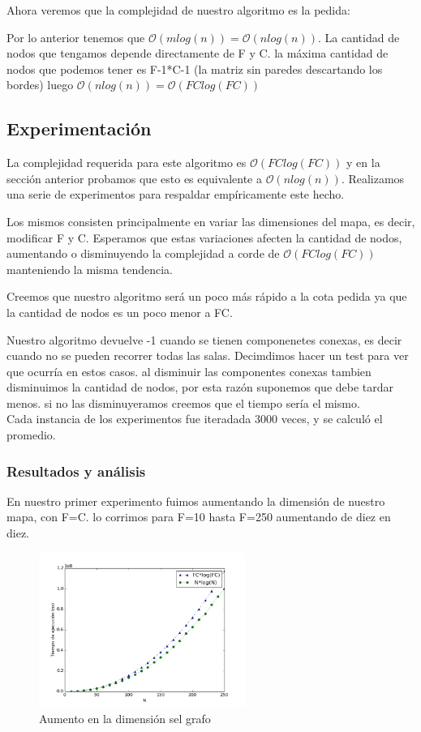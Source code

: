 \documentclass[spanish,12pt]{article}
\begin{document}
Ahora veremos que la complejidad de nuestro algoritmo es la pedida:

Por lo anterior tenemos que $\mathcal{O}(mlog(n))= \mathcal{O}(nlog(n))$.
La cantidad de nodos que tengamos depende directamente de F y C. la máxima cantidad de nodos que podemos tener es F-1*C-1 (la matriz sin paredes descartando los bordes) luego $\mathcal{O}(nlog(n)) = \mathcal{O}(FClog(FC))$ 


\subsection{Experimentación}

La complejidad requerida para este algoritmo es $\mathcal{O}(FClog(FC))$ y en la sección anterior probamos que esto es equivalente a  $\mathcal{O}(nlog(n))$.
Realizamos una serie de experimentos para respaldar empíricamente este hecho.

Los mismos consisten principalmente en variar las dimensiones del mapa, es decir, modificar F y C. Esperamos que estas variaciones afecten la cantidad de nodos, aumentando o disminuyendo la complejidad a corde de $\mathcal{O}(FClog(FC))$ manteniendo la misma tendencia. 

Creemos que nuestro algoritmo será un poco más rápido a la cota pedida ya que la cantidad de nodos es un poco menor a FC.

Nuestro algoritmo devuelve -1 cuando se tienen componenetes conexas, es decir cuando no se pueden recorrer todas las salas. Decimdimos hacer un test para ver que ocurría en estos casos. al disminuir las componentes conexas tambien disminuimos la cantidad de nodos, por esta razón suponemos que debe tardar menos. si no las disminuyeramos creemos que el tiempo sería el mismo.
\\
Cada instancia de los experimentos fue iteradada 3000 veces, y se calculó el promedio.
\subsubsection{Resultados y análisis}

En nuestro primer experimento fuimos aumentando la dimensión de nuestro mapa, con F=C. lo corrimos para F=10 hasta F=250 aumentando de diez en diez.

\begin{figure}[H]
\centering
\includegraphics[width=0.6\textwidth]{sinParedes}
\caption{Aumento en la dimensión sel grafo}
\end{figure}
\end{document}
